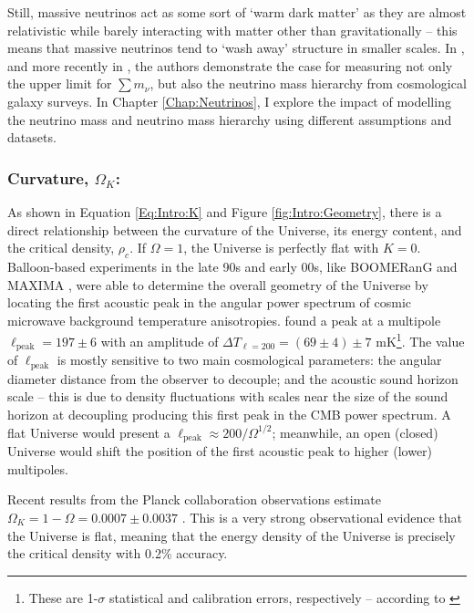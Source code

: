 \qquad Still, massive neutrinos act as some sort of `warm dark matter' as they are almost relativistic while barely interacting with matter other than gravitationally -- this means that massive neutrinos tend to `wash away' structure in smaller scales. In \cite{2003HannestadNeutrino}, and more recently in \cite{2016Hannestad}, the authors demonstrate the case for measuring not only the upper limit for $\sum m_{\nu}$, but also the neutrino mass hierarchy from cosmological galaxy surveys. In Chapter \ref{Chap:Neutrinos}, I explore the impact of modelling the neutrino mass and neutrino mass hierarchy using different assumptions and datasets.


\subsubsection{Curvature, $\Omega_K$:}
As shown in Equation \eqref{Eq:Intro:K} and Figure \ref{fig:Intro:Geometry}, there is a direct relationship between the curvature of the Universe, its energy content, and the critical density, $\rho_c$. If $\Omega = 1$, the Universe is perfectly flat with $K=0$. Balloon-based experiments in the late 90s and early 00s, like BOOMERanG \citep{2000-BOOMERANG} and MAXIMA \citep{2000Hanany-MAXIMA}, were able to determine the overall geometry of the Universe by locating the first acoustic peak in the angular power spectrum of cosmic microwave background temperature anisotropies. \cite{2000-BOOMERANG} found a peak at a multipole $\ell_{\text{peak}} = 197\pm 6$ with an amplitude of $\Delta T_{\ell=200} = (69\pm 4) \pm 7$ mK\footnote{ These are 1-$\sigma$ statistical and calibration errors, respectively -- according to \cite{2000-BOOMERANG}}. The value of $\ell_{\text{peak}}$ is mostly sensitive to two main cosmological parameters: the angular diameter distance from the observer to decouple; and the acoustic sound horizon scale -- this is due to density fluctuations with scales near the size of the sound horizon at decoupling producing this first peak in the CMB power spectrum. A flat Universe would present a $\ell_{\text{peak}}\approx 200/\Omega^{1/2}$; meanwhile, an open (closed) Universe would shift the position of the first acoustic peak to higher (lower) multipoles.

\qquad Recent results from the Planck collaboration observations estimate $\Omega_K = 1 - \Omega = 0.0007\pm 0.0037$ \citep{2018PlanckCosmology}. This is a very strong observational evidence that the Universe is flat, meaning that the energy density of the Universe is precisely the critical density with 0.2\% accuracy. 

